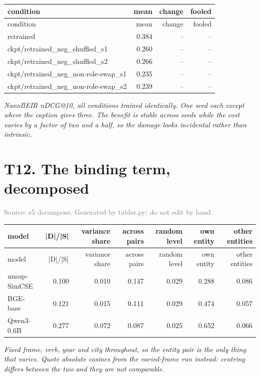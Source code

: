 \documentclass[10pt]{article}
\begin{document}
\footnotesize
\begin{longtable}{>{\raggedright\arraybackslash}p{4.6cm}rrr}
\toprule
condition & mean & change & fooled \\
\midrule
\endfirsthead
\toprule
condition & mean & change & fooled \\
\midrule
\endhead
\bottomrule
\endfoot
retrained & 0.384 & -- & -- \\
ckpt/retrained\_neg\_shuffled\_s1 & 0.260 & -- & -- \\
ckpt/retrained\_neg\_shuffled\_s2 & 0.266 & -- & -- \\
ckpt/retrained\_neg\_non-role-swap\_s1 & 0.235 & -- & -- \\
ckpt/retrained\_neg\_non-role-swap\_s2 & 0.239 & -- & -- \\
\end{longtable}
\normalsize

\textit{NanoBEIR nDCG@10, all conditions trained identically. One seed each except where the caption gives three. The benefit is stable across seeds while the cost varies by a factor of two and a half, so the damage looks incidental rather than intrinsic.}
\clearpage

\section*{T12. The binding term, decomposed}
\textcolor{gray}{Source: e5 decompose. Generated by tables.py; do not edit by hand.}

\footnotesize
\begin{longtable}{lrrrrrr}
\toprule
model & |D|/|S| & variance share & across pairs & random level & own entity & other entities \\
\midrule
\endfirsthead
\toprule
model & |D|/|S| & variance share & across pairs & random level & own entity & other entities \\
\midrule
\endhead
\bottomrule
\endfoot
unsup-SimCSE & 0.100 & 0.010 & 0.147 & 0.029 & 0.288 & 0.086 \\
BGE-base & 0.121 & 0.015 & 0.111 & 0.029 & 0.474 & 0.057 \\
Qwen3-0.6B & 0.277 & 0.072 & 0.087 & 0.025 & 0.652 & 0.066 \\
\end{longtable}
\normalsize

\textit{Fixed frame, verb, year and city throughout, so the entity pair is the only thing that varies. Quote absolute cosines from the varied-frame run instead: centring differs between the two and they are not comparable.}
\clearpage
\end{document}

